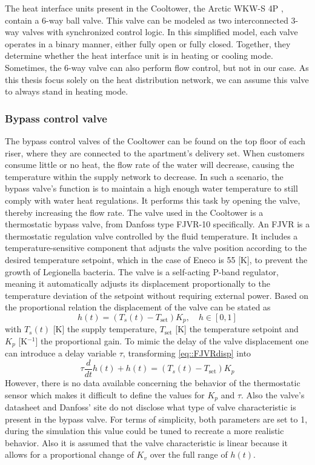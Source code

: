 The heat interface units present in the Cooltower, the Arctic WKW-S 4P \cite{fortes_wkw_s_4p}, contain a 6-way ball valve. This valve can be modeled as two interconnected 3-way valves with synchronized control logic. In this simplified model, each valve operates in a binary manner, either fully open or fully closed. Together, they determine whether the heat interface unit is in heating or cooling mode. Sometimes, the 6-way valve can also perform flow control, but not in our case. As this thesis focus solely on the heat distribution network, we can assume this valve to always stand in heating mode.


\subsubsection{Bypass control valve}\label{sec::overflowmech}
The bypass control valves of the Cooltower can be found on the top floor of each riser, where they are connected to the apartment's delivery set. When customers consume little or no heat, the flow rate of the water will decrease, causing the temperature within the supply network to decrease. In such a scenario, the bypass valve's function is to maintain a high enough water temperature to still comply with water heat regulations. It performs this task by opening the valve, thereby increasing the flow rate. The valve used in the Cooltower is a thermostatic bypass valve, from Danfoss type FJVR-10 specifically. An FJVR is a thermostatic regulation valve controlled by the fluid temperature. It includes a temperature-sensitive component that adjusts the valve position according to the desired temperature setpoint, which in the case of Eneco is 55 [K], to prevent the growth of Legionella bacteria. The valve is a self-acting P-band regulator, meaning it automatically adjusts its displacement proportionally to the temperature deviation of the setpoint without requiring external power. Based on the proportional relation the displacement of the valve can be stated as
\begin{equation}\label{eq::FJVRdisp}
    h(t) = (T_s(t) - T_{\text{set}})K_p, \quad h \in [0,1]
\end{equation}
with $T_s(t)$ [K] the supply temperature, $T_{\text{set}}$ [K] the temperature setpoint and $K_p$ [K$^{-1}$] the proportional gain. To mimic the delay of the valve displacement one can introduce a delay variable $\tau$, transforming \ref{eq::FJVRdisp} into
\begin{equation}
    \tau \frac{d}{dt}h(t) + h(t) = (T_s(t) - T_{\text{set}})K_p 
\end{equation} 
However, there is no data available concerning the behavior of the thermostatic sensor which makes it difficult to define the values for $K_p$ and $\tau$. Also the valve's datasheet and Danfoss' site do not disclose what type of valve characteristic is present in the bypass valve. For terms of simplicity, both parameters are set to 1, during the simulation this value could be tuned to recreate a more realistic behavior. Also it is assumed that the valve characteristic is linear because it allows for a proportional change of $K_v$ over the full range of $h(t)$.

